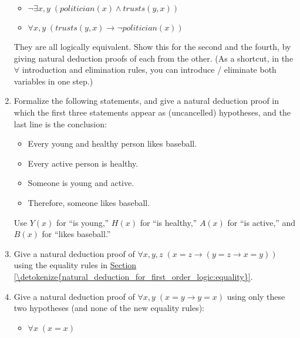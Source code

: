 \documentclass[letterpaper,10pt,english]{sphinxmanual}
\begin{document}
\begin{enumerate}
\begin{itemize}
\item {} 
\sphinxAtStartPar
\(\neg \exists x,y \; (\mathit{politician}(x) \wedge \mathit{trusts}(y,x))\)

\item {} 
\sphinxAtStartPar
\(\forall x, y \; (\mathit{trusts}(y,x) \to \neg \mathit{politician}(x))\)

\end{itemize}

\sphinxAtStartPar
They are all logically equivalent. Show this for the second and the fourth, by giving natural deduction proofs of each from the other. (As a shortcut, in the \(\forall\) introduction and elimination rules, you can introduce / eliminate both variables in one step.)

\item {} 
\sphinxAtStartPar
Formalize the following statements, and give a natural deduction proof in which the first three statements appear as (uncancelled) hypotheses, and the last line is the conclusion:
\begin{itemize}
\item {} 
\sphinxAtStartPar
Every young and healthy person likes baseball.

\item {} 
\sphinxAtStartPar
Every active person is healthy.

\item {} 
\sphinxAtStartPar
Someone is young and active.

\item {} 
\sphinxAtStartPar
Therefore, someone likes baseball.

\end{itemize}

\sphinxAtStartPar
Use \(Y(x)\) for “is young,” \(H(x)\) for “is healthy,” \(A(x)\) for “is active,” and \(B(x)\) for “likes baseball.”

\item {} 
\sphinxAtStartPar
Give a natural deduction proof of \(\forall x, y, z \; (x = z \to (y = z \to x = y))\) using the equality rules in \hyperref[\detokenize{natural_deduction_for_first_order_logic:equality}]{Section \ref{\detokenize{natural_deduction_for_first_order_logic:equality}}}.

\item {} 
\sphinxAtStartPar
Give a natural deduction proof of \(\forall x, y \; (x = y \to y = x)\) using only these two hypotheses (and none of the new equality rules):
\begin{itemize}
\item {} 
\sphinxAtStartPar
\(\forall x \; (x = x)\)


\end{itemize}
\end{enumerate}
\end{document}
